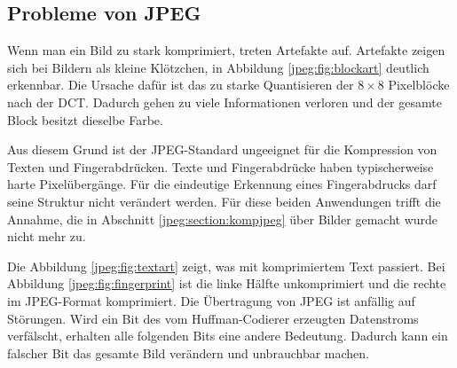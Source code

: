 \subsection{Probleme von JPEG
\label{jpeg:subsection:probleme}}
Wenn man ein Bild zu stark komprimiert, treten Artefakte auf.
%
Artefakte zeigen sich bei Bildern als kleine Klötzchen, in Abbildung \ref{jpeg:fig:blockart} deutlich erkennbar.
Die Ursache dafür ist das zu starke Quanti\-sieren der \(8\times8\) Pixelblöcke nach der DCT.
Dadurch gehen zu viele Informationen verloren und der gesamte Block besitzt dieselbe Farbe.

Aus diesem Grund ist der JPEG-Standard ungeeignet für die Kompression von Texten und Finger\-abdrücken.
Texte und Fingerabdrücke haben typischerweise harte Pixelübergänge.
Für die eindeutige Erkennung eines Fingerabdrucks darf seine Struktur nicht verändert werden.
Für diese beiden Anwendungen trifft die Annahme, die in Abschnitt \ref{jpeg:section:kompjpeg} über Bilder gemacht wurde nicht mehr zu.

Die Abbildung \ref{jpeg:fig:textart} zeigt, was mit komprimiertem Text passiert.
Bei Abbildung \ref{jpeg:fig:fingerprint} ist die linke Hälfte unkomprimiert und die rechte im JPEG-Format komprimiert.
Die Übertragung von JPEG ist anfällig auf Störungen.
Wird ein Bit des vom Huffman-Codierer erzeugten Datenstroms verfälscht, erhalten alle folgenden Bits eine andere Bedeutung. 
Dadurch kann ein falscher Bit das gesamte Bild verändern und unbrauchbar machen.



